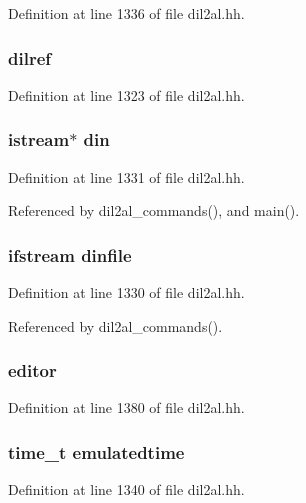 Definition at line 1336 of file dil2al.hh.
\subsubsection{ dilref}\label{dil2al_8hh_a121}




Definition at line 1323 of file dil2al.hh.
\subsubsection{\setlength{\rightskip}{0pt plus 5cm}istream$\ast$ din}\label{dil2al_8hh_a129}




Definition at line 1331 of file dil2al.hh.

Referenced by dil2al\_\-commands(), and main().
\subsubsection{\setlength{\rightskip}{0pt plus 5cm}ifstream dinfile}\label{dil2al_8hh_a128}




Definition at line 1330 of file dil2al.hh.

Referenced by dil2al\_\-commands().
\subsubsection{ editor}\label{dil2al_8hh_a186}




Definition at line 1380 of file dil2al.hh.
\subsubsection{\setlength{\rightskip}{0pt plus 5cm}time\_\-t emulatedtime}\label{dil2al_8hh_a145}




Definition at line 1340 of file dil2al.hh.

